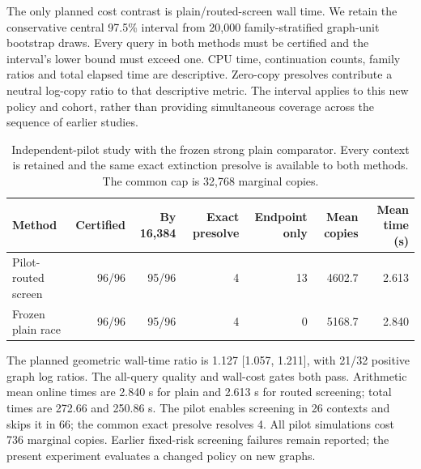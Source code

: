 \documentclass[preprint,11pt,sort&compress]{elsarticle}
\begin{document}
The only planned cost contrast is plain/routed-screen wall time. We retain
the conservative central 97.5\% interval from 20,000 family-stratified
graph-unit bootstrap draws. Every query in both methods must be certified
and the interval's lower bound must exceed one. CPU time, continuation
counts, family ratios and total elapsed time are descriptive. Zero-copy
presolves contribute a neutral log-copy ratio to that descriptive metric.
The interval applies to this new policy and cohort, rather than providing
simultaneous coverage across the sequence of earlier studies.

\begin{table}[!htbp]
\centering\small
\caption{Independent-pilot study with the frozen strong plain comparator. Every context is retained and the same exact extinction presolve is available to both methods. The common cap is 32,768 marginal copies.}
\label{tab:adaptive_cells}
\setlength{\tabcolsep}{4pt}\begin{tabular}{lrrrrrr}
\toprule
Method & Certified & By 16,384 & Exact presolve & Endpoint only & Mean copies & Mean time (s)\\
\midrule
Pilot-routed screen & 96/96 & 95/96 & 4 & 13 & 4602.7 & 2.613 \\
Frozen plain race & 96/96 & 95/96 & 4 & 0 & 5168.7 & 2.840 \\
\bottomrule
\end{tabular}
\end{table}
The planned geometric wall-time ratio is 1.127 [1.057, 1.211], with 21/32 positive graph log ratios. The all-query quality and wall-cost gates both pass. Arithmetic mean online times are 2.840 s for plain and 2.613 s for routed screening; total times are 272.66 and 250.86 s. The pilot enables screening in 26 contexts and skips it in 66; the common exact presolve resolves 4. All pilot simulations cost 736 marginal copies. Earlier fixed-risk screening failures remain reported; the present experiment evaluates a changed policy on new graphs.
\end{document}
